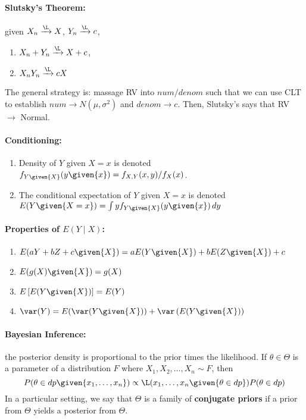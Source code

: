 \documentclass[10pt]{article}
\begin{document}
\begin{multicols}{2}
\paragraph{Slutsky's Theorem:} given $X_n \xrightarrow{\L} X$, $Y_n \xrightarrow{\L} c$, 
\begin{enumerate}
\item $X_n + Y_n \xrightarrow{\L} X+c$,
\item $X_n Y_n \xrightarrow{\L} cX$
\end{enumerate}
The general strategy is: massage RV into $num/denom$ such that we can use CLT to establish $num \to N(\mu,\sigma^2)$ and $denom \to c$. Then, Slutsky's says that RV $\to$ Normal. 

\paragraph{Conditioning:}
\begin{enumerate}
\item Density of $Y$ given $X=x$ is denoted $f_{Y\given{X}}(y\given{x}) = f_{X,Y}(x,y)/f_{X}(x)$. 
\item The conditional expectation of $Y$ given $X=x$ is denoted $E(Y\given{X=x}) = \int y f_{Y\given{X}}(y\given{x}) \, dy$
\end{enumerate}

\paragraph{Properties of $E(Y\mid X)$:}
\begin{enumerate}
\item $E(aY + bZ + c\given{X}) = a E(Y\given{X}) + b E(Z\given{X}) + c $
\item $E(g(X) \given{X}) = g(X)$
\item $E\left[ E(Y\given{X}) \right] = E(Y)$
\item $\var(Y) = E(\var(Y\given{X})) + \var\left( E(Y\given{X}) \right)$
\end{enumerate}

\paragraph{Bayesian Inference:} the posterior density is proportional to the prior times the likelihood. If $\theta \in \Theta$ is a parameter of a distribution $F$ where $X_1, X_2, \ldots, X_n \sim F$, then
\[
P( \theta \in dp \given{x_1, \ldots, x_n}) \propto \L(x_1, \ldots, x_n \given{\theta \in dp}) P(\theta \in dp)
\]
In a particular setting, we say that $\Theta$ is a family of \textbf{conjugate priors} if a prior from $\Theta$ yields a posterior from $\Theta$. 


\end{multicols}
\end{document}

